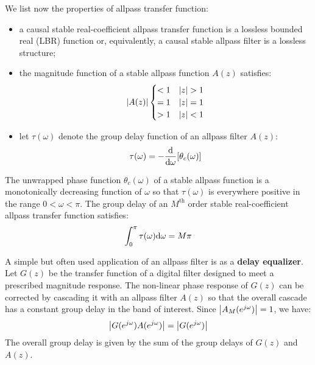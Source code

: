 \documentclass[../../main/main.tex]{subfiles}
\begin{document}
\medskip
{}
We list now the properties of allpass transfer function:
\begin{itemize}
    \item a causal stable real-coefficient allpass transfer function is a lossless bounded real (LBR) function or, equivalently, a causal stable allpass filter is a lossless structure;

    \item the magnitude function of a stable allpass function \( A(z) \) satisfies:
    \begin{equation}
        \abs{A(z)}
        \begin{cases}
            <1  &   \abs{z} > 1 \\
            =1  &   \abs{z} = 1 \\
            >1  &   \abs{z} < 1
        \end{cases}
        \label{eq:L17_S52_1}
    \end{equation}

    \item let \( \tau(\omega) \) denote the group delay function of an allpass filter \( A(z) \):
    \begin{equation}
        \tau(\omega)
        =
        - \dv{}{\omega} \qty[\theta_{c}(\omega)]
        \label{eq:L17_S52_2}
    \end{equation}
\end{itemize}

The unwrapped phase function \( \theta_{c}(\omega) \) of a stable allpass function is a monotonically decreasing function of \( \omega \) so that \( \tau(\omega) \) is everywhere positive in the range \( 0 < \omega < \pi \). The group delay of an \( M^{\text{th}} \) order stable real-coefficient allpass transfer function satisfies:
\begin{equation}
    \int_{0}^{\pi} \tau(\omega) \mathrm{d}{\omega}
    =
    M\pi
    \label{eq:L17_S53_1}
\end{equation}

A simple but often used application of an allpass filter is as a \textbf{delay equalizer}.
Let \( G(z) \) be the transfer function of a digital filter designed to meet a prescribed magnitude response. The non-linear phase response of \( G(z) \) can be corrected by cascading it with an allpass filter \( A(z) \) so that the overall cascade has a constant group delay in the band of interest.
Since \( \abs{A_{M}(e^{j\omega})} = 1 \), we have:
\begin{equation}
    \abs{G(e^{j\omega}) A(e^{j\omega})}
    =
    \abs{G(e^{j\omega})}
    \label{eq:L17_S55_1}
\end{equation}
The overall group delay is given by the sum of the group delays of \( G(z) \) and \( A(z) \).
\end{document}
